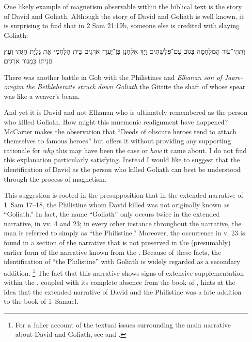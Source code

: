 One likely example of magnetism observable within the biblical text is the story of David and Goliath. Although the story of David and Goliath is well known, it is surprising to find that in 2 Sam 21:19b, someone else is credited with slaying Goliath:
\begin{hebrewtext}
    וַתְּהִי־עוֹד הַמִּלְחָמָה בְּגוֹב עִם־פְּלִשְׁתִּים וַיַּךְ אֶלְחָנָן בֶּן־יַעְרֵי אֹרְגִים בֵּית הַלַּחְמִי אֵת גָּלְיָת הַגִּתִּי וְעֵץ חֲנִיתוֹ כִּמְנוֹר אֹרְגִים׃
\end{hebrewtext}
\begin{translation}
    There was another battle in Gob with the Philistines and \emph{Elhanan son of Jaare-oregim the Bethlehemite struck down Goliath} the Gittite the shaft of whose spear was like a weaver's beam.
\end{translation}
\noindent
And yet it is David and not Elhanan who is ultimately remembered as the person who killed Goliath. How might this mnemonic realignment have happened? McCarter makes the observation that ``Deeds of obscure heroes tend to attach themselves to famous heroes''%
    \autocite[450]{mccarter1984}
but offers it without providing any supporting rationale for \emph{why} this may have been the case or \emph{how} it came about. I do not find this explanation particularly satisfying. Instead I would like to suggest that the identification of David as the person who killed Goliath can best be understood through the process of magnetism.

This suggestion is rooted in the presupposition that in the extended narrative of 1~Sam 17--18, the Philistine whom David killed was not originally known as ``Goliath.'' In fact, the name ``Goliath'' only occurs twice in the extended narrative, in vv. 4 and 23; in every other instance throughout the narrative, the man is referred to simply as ``the Philistine.'' Moreover, the occurrence in v. 23 is found in a section of the narrative that is not preserved in the (presumably) earlier form of the narrative known from the \lxx. Because of these facts, the identification of ``the Philistine'' with Goliath is widely regarded as a secondary addition.%
    \footnote{For a fuller account of the textual issues surrounding the main narrative about David and Goliath, see 
        \cite[245--265]{hutton2009}
        \cite[280--309]{mccarter1980} and 
        \cite[69--77]{mckenzie2000}.}
The fact that this narrative shows signs of extensive supplementation within the \mt, coupled with its complete absence from the book of \chronicles, hints at the idea that the extended narrative of David and the Philistine was a late addition to the book of 1~Samuel.%

